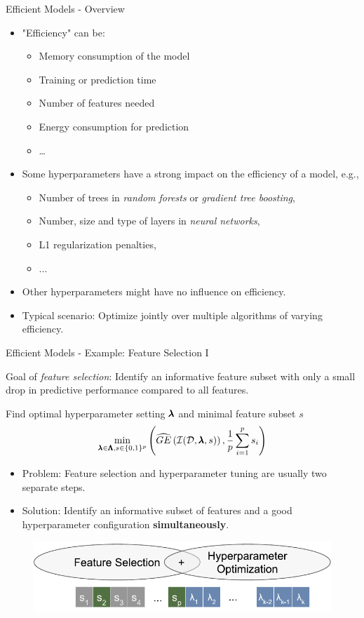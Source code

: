 \begin{frame}{Efficient Models - Overview}

\begin{itemize}
  \item "Efficiency" can be:
  \begin{itemize}
    \item Memory consumption of the model
    \item Training or prediction time
    \item Number of features needed
    \item Energy consumption for prediction
    \item \ldots
  \end{itemize}
  \item Some hyperparameters have a strong impact on the efficiency of a model, e.g.,
  \begin{itemize}
    \item Number of trees in \emph{random forests} or \emph{gradient tree boosting},
    \item Number, size and type of layers in \emph{neural networks},
    \item L1 regularization penalties,
    \item ...
  \end{itemize}
  \item Other hyperparameters might have no influence on efficiency.
  \item Typical scenario: Optimize jointly over multiple algorithms of varying efficiency.
\end{itemize}

\end{frame}

\begin{frame}{Efficient Models - Example: Feature Selection I}

Goal of \emph{feature selection}: Identify an informative feature subset with only a small drop in predictive performance compared to all features.

    \vspace{0.5cm}
Find optimal hyperparameter setting $\pmb{\lambda}$ and minimal feature subset $s$
\[
\min_{\pmb{\lambda} \in \pmb{\Lambda}, s \in \{0,1\}^p}\left( \widehat{GE}\left(\mathcal{I}(\mathcal{D}, \pmb{\lambda}, s)\right), \frac{1}{p}\sum_{i=1}^p s_i \right)
\]
\begin{itemize}
  \item Problem: Feature selection and hyperparameter tuning are usually two separate steps.
  \item Solution: Identify an informative subset of features and a good hyperparameter configuration \textbf{simultaneously}.

\end{itemize}
\begin{figure}
  \centering
  \includegraphics[width = 0.5\linewidth]{images/mosmafs_presentation_p14.pdf}
\end{figure}

\end{frame}

